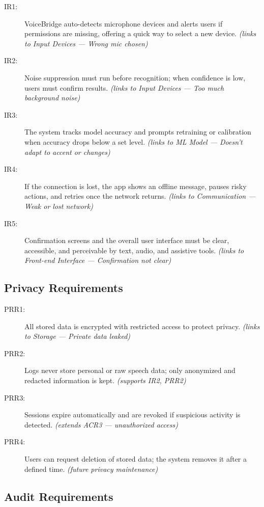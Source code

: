 \documentclass{article}
\begin{document}
\begin{description}
  \item[IR1:] VoiceBridge auto-detects microphone devices and alerts users if permissions are missing, offering a quick way to select a new device. \emph{(links to Input Devices — Wrong mic chosen)}
  \item[IR2:] Noise suppression must run before recognition; when confidence is low, users must confirm results. \emph{(links to Input Devices — Too much background noise)}
  \item[IR3:] The system tracks model accuracy and prompts retraining or calibration when accuracy drops below a set level. \emph{(links to ML Model — Doesn’t adapt to accent or changes)}
  \item[IR4:] If the connection is lost, the app shows an offline message, pauses risky actions, and retries once the network returns. \emph{(links to Communication — Weak or lost network)}
  \item[IR5:] Confirmation screens and the overall user interface must be clear, accessible, and perceivable by text, audio, and assistive tools. \emph{(links to Front-end Interface — Confirmation not clear)}
\end{description}

\subsection{Privacy Requirements}

\begin{description}
  \item[PRR1:] All stored data is encrypted with restricted access to protect privacy. \emph{(links to Storage — Private data leaked)}
  \item[PRR2:] Logs never store personal or raw speech data; only anonymized and redacted information is kept. \emph{(supports IR2, PRR2)}
  \item[PRR3:] Sessions expire automatically and are revoked if suspicious activity is detected. \emph{(extends ACR3 — unauthorized access)}
  \item[PRR4:] Users can request deletion of stored data; the system removes it after a defined time. \emph{(future privacy maintenance)}
\end{description}

\subsection{Audit Requirements}
\end{document}

